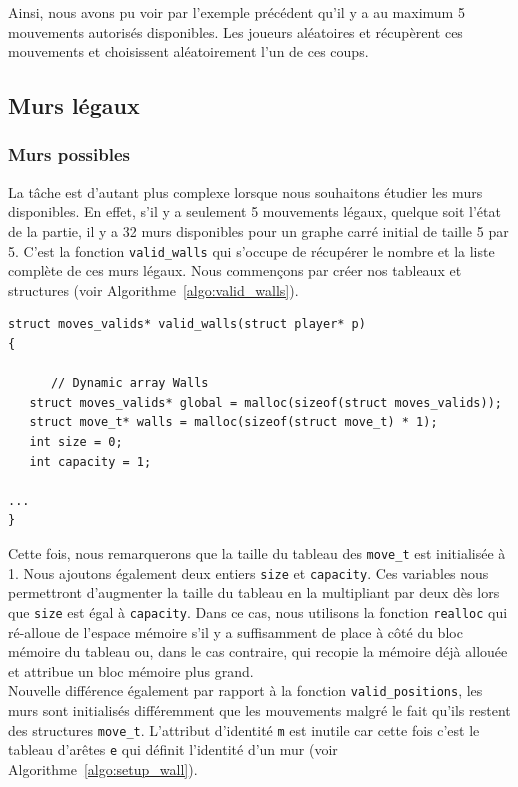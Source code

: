 \documentclass[a4paper]{article}
\begin{document}
Ainsi, nous avons pu voir par l'exemple précédent qu'il y a au maximum 5 mouvements autorisés disponibles. Les joueurs aléatoires  et  récupèrent ces mouvements et choisissent aléatoirement l'un de ces coups.



\subsection{Murs légaux}

\subsubsection{Murs possibles}
\label{subsect:valid_walls}
La tâche est d'autant plus complexe lorsque nous souhaitons étudier les murs disponibles. En effet, s'il y a seulement 5 mouvements légaux, quelque soit l'état de la partie, il y a 32 murs disponibles pour un graphe carré initial de taille 5 par 5. C'est la fonction \texttt{valid\_walls} qui s'occupe de récupérer le nombre et la liste complète de ces murs légaux. Nous commençons par créer nos tableaux et structures (voir Algorithme~\ref{algo:valid_walls}). \\

\begin{lstlisting}[caption = {Entête de la fonction déterminant les murs légaux}, label = {algo:valid_walls}, float = h]
struct moves_valids* valid_walls(struct player* p)
{
   
      // Dynamic array Walls
   struct moves_valids* global = malloc(sizeof(struct moves_valids)); 
   struct move_t* walls = malloc(sizeof(struct move_t) * 1); 
   int size = 0; 
   int capacity = 1; 
   
...
}
\end{lstlisting}

Cette fois, nous remarquerons que la taille du tableau des \texttt{move\_t} est initialisée à 1. Nous ajoutons également deux entiers \texttt{size} et \texttt{capacity}. Ces variables nous permettront d'augmenter la taille du tableau en la multipliant par deux dès lors que \texttt{size} est égal à \texttt{capacity}. Dans ce cas, nous utilisons la fonction \texttt{realloc} qui ré-alloue de l'espace mémoire s'il y a suffisamment de place à côté du bloc mémoire du tableau ou, dans le cas contraire, qui recopie la mémoire déjà allouée et attribue un bloc mémoire plus grand. \\

Nouvelle différence également par rapport à la fonction \texttt{valid\_positions}, les murs sont initialisés différemment que les mouvements malgré le fait qu'ils restent des structures \texttt{move\_t}. L'attribut d'identité \texttt{m} est inutile car cette fois c'est le tableau d'arêtes \texttt{e} qui définit l'identité d'un mur (voir Algorithme~\ref{algo:setup_wall}). 
\end{document}
